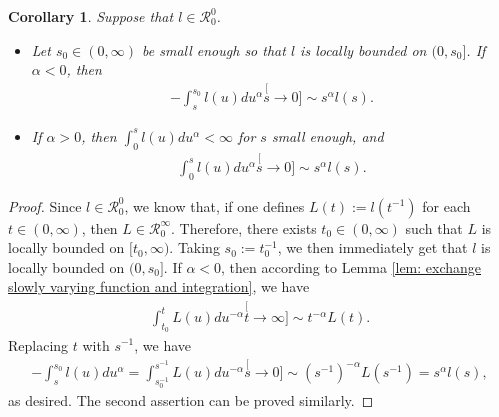 \documentclass[12pt,a4paper]{amsart}
\newtheorem{cro}[thm]{Corollary}
\theoremstyle{definition}
\numberwithin{equation}{section}
\begin{document}
\begin{cro}
  \label{cro: power law and ingetration}
  Suppose that $l\in \mathcal R^0_0$.
  \begin{itemize}
  \item
    Let $s_0\in (0,\infty)$ be small enough so that $l$ is locally bounded on $(0,s_0]$.
    If $\alpha < 0$, then
    \begin{align}
      -\int_s^{s_0} l(u)du^\alpha
      \stackrel[s\to 0]{}{\sim} s^{\alpha} l(s).
    \end{align}
  \item
    If $\alpha > 0$, then $\int_0^s l(u)du^\alpha<\infty$ for $s$ small enough, and
    \begin{align}
      \int_0^s l(u)du^\alpha
      \stackrel[s\to 0]{}{\sim} s^{\alpha} l(s).
    \end{align}
  \end{itemize}
\end{cro}	

\begin{proof}
	Since $l \in \mathcal R^0_0$, we know that, if one defines $L(t):=l(t^{-1})$ for each $t\in (0,\infty)$, then $ L \in \mathcal R^\infty_0$.
	Therefore, there exists $t_0\in (0,\infty)$ such that $L$ is locally bounded on $[t_0,\infty)$.
	Taking $s_0:= t_0^{-1}$, we then immediately get that $l$ is locally bounded on $(0,s_0]$.
	If $\alpha<0 $, then according to Lemma \ref{lem: exchange slowly varying function and integration}, we have
  \begin{align}
    \int_{t_0}^t L(u)du^{-\alpha}
    \stackrel[t\to \infty]{}{\sim} t^{-\alpha}  L(t).
  \end{align}
	Replacing $t$ with $s^{-1}$, we have
  \begin{align}
    -\int_{s}^{s_0} l(u)du^{\alpha}
    =\int_{s_0^{-1}}^{s^{-1}} L(u)du^{-\alpha}
    \stackrel[s\to 0]{}{\sim}  (s^{-1})^{-\alpha}L(s^{-1})
    =s^\alpha l(s),
  \end{align}
	as desired.
	The second assertion can be proved similarly.
\end{proof}
\end{document}
